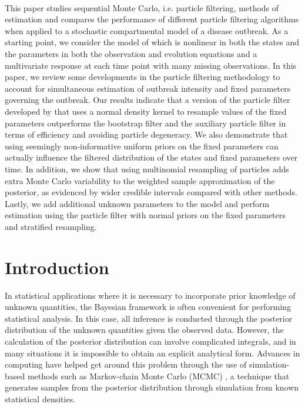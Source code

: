 \documentclass{elsarticle}
\begin{document}
 \\

This paper studies sequential Monte Carlo, i.e. particle filtering, methods of estimation and compares the performance of different particle filtering algorithms when applied to a stochastic compartmental model of a disease outbreak. As a starting point, we consider the model of \citet{skvortsov2012monitoring} which is nonlinear in both the states and the parameters in both the observation and evolution equations and a multivariate response at each time point with many missing observations. In this paper, we review some developments in the particle filtering methodology to account for simultaneous estimation of outbreak intensity and fixed parameters governing the outbreak. Our results indicate that a version of the particle filter developed by \citet{Liu:West:comb:2001} that uses a normal density kernel to resample values of the fixed parameters outperforms the bootstrap filter and the auxiliary particle filter in terms of efficiency and avoiding particle degeneracy. We also demonstrate that using seemingly non-informative uniform priors on the fixed parameters can actually influence the filtered distribution of the states and fixed parameters over time.  In addition, we show that using multinomial resampling of particles adds extra Monte Carlo variability to the weighted sample approximation of the posterior, as evidenced by wider credible intervals compared with other methods.  Lastly, we add additional unknown parameters to the model and perform estimation using the \citet{Liu:West:comb:2001} particle filter with normal priors on the fixed parameters and stratified resampling.

\section{Introduction} \label{sec:intro}

In statistical applications where it is necessary to incorporate prior knowledge of unknown quantities, the Bayesian framework is often convenient for performing statistical analysis.  In this case, all inference is conducted through the posterior distribution of the unknown quantities given the observed data.  However, the calculation of the posterior distribution can involve complicated integrals, and in many situations it is impossible to obtain an explicit analytical form.  Advances in computing have helped get around this problem through the use of simulation-based methods such as Markov-chain Monte Carlo (MCMC) \citep{Gelf:Smit:samp:1990}, a technique that generates samples from the posterior distribution through simulation from known statistical densities.
\end{document}
